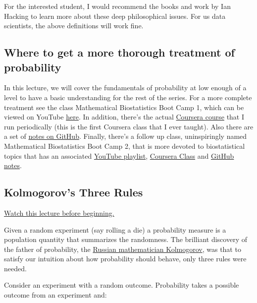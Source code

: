 \documentclass[]{article}
\begin{document}
For the interested student, I would recommend the books and work by Ian
Hacking to learn more about these deep philosophical issues. For us data
scientists, the above definitions will work fine.

\subsection{Where to get a more thorough treatment of
probability}\label{where-to-get-a-more-thorough-treatment-of-probability}

In this lecture, we will cover the fundamentals of probability at low
enough of a level to have a basic understanding for the rest of the
series. For a more complete treatment see the class Mathematical
Biostatistics Boot Camp 1, which can be viewed on YouTube
\href{Youtube:\%20www.youtube.com/playlist?list=PLpl-gQkQivXhk6qSyiNj51qamjAtZISJ-}{here}.
In addition, there's the actual
\href{Coursera:\%20www.coursera.org/course/biostats}{Coursera course}
that I run periodically (this is the first Coursera class that I ever
taught). Also there are a set of
\href{http://github.com/bcaffo/Caffo-Coursera}{notes on GitHub}.
Finally, there's a follow up class, uninspiringly named Mathematical
Biostatistics Boot Camp 2, that is more devoted to biostatistical topics
that has an associated
\href{http://www.youtube.com/playlist?list=PLpl-gQkQivXhwOsKPQ4fbCBYOWjvdzrSM}{YouTube
playlist}, \href{https://www.coursera.org/course/biostats2}{Coursera
Class} and
\href{https://github.com/bcaffo/MathematicsBiostatisticsBootCamp2}{GitHub
notes}.

\subsection{Kolmogorov's Three Rules}\label{kolmogorovs-three-rules}

\href{http://youtu.be/Shzt9uZ8BII?list=PLpl-gQkQivXiBmGyzLrUjzsblmQsLtkzJ}{Watch
this lecture before beginning.}

Given a random experiment (say rolling a die) a probability measure is a
population quantity that summarizes the randomness. The brilliant
discovery of the father of probability, the
\href{http://en.wikipedia.org/wiki/Andrey_Kolmogorov}{Russian
mathematician Kolmogorov}, was that to satisfy our intuition about how
probability should behave, only three rules were needed.

Consider an experiment with a random outcome. Probability takes a
possible outcome from an experiment and:
\end{document}
